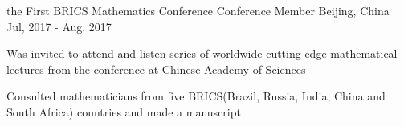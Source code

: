 \begin{cventries}

   \cventry
    {the First BRICS Mathematics Conference} %
    {Conference Member} %
    {Beijing, China} %
    {Jul, 2017 - Aug. 2017} %
    {
      \begin{cvitems} %
        \item {Was invited to attend and listen series of worldwide cutting-edge mathematical lectures from the conference at Chinese Academy of Sciences}
        \item {Consulted mathematicians from five BRICS(Brazil, Russia, India, China and South Africa) countries and made a manuscript}
      \end{cvitems}
    }
    
    
\end{cventries}
